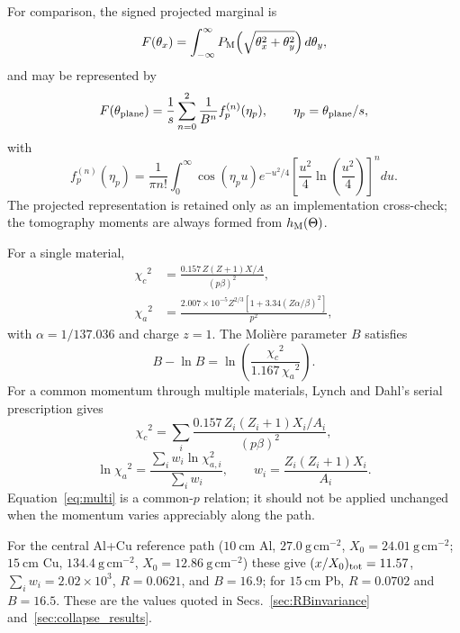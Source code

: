 \documentclass[aps,pra,reprint,longbibliography,floatfix]{revtex4-2}
\newcommand{\XZero}{\ensuremath{X_0}}
\newcommand{\chic}{\ensuremath{\chi_c}}
\newcommand{\chia}{\ensuremath{\chi_a}}
\begin{document}
For comparison, the signed projected marginal is
\begin{equation}
F(\theta_x)=\int_{-\infty}^{\infty}P_{\rm M}\!\left(\sqrt{\theta_x^2+\theta_y^2}\right)d\theta_y,
\end{equation}
and may be represented by
\begin{equation}
F(\theta_{\rm plane})=\frac{1}{s}\sum_{n=0}^{2}\frac{1}{B^n}f_p^{(n)}(\eta_p),
\qquad \eta_p=\theta_{\rm plane}/s,
\end{equation}
with
\begin{equation}
f_p^{(n)}(\eta_p)=\frac{1}{\pi n!}\int_0^\infty
\cos(\eta_pu)e^{-u^2/4}
\left[\frac{u^2}{4}\ln\!\left(\frac{u^2}{4}\right)\right]^n du.
\end{equation}
The projected representation is retained only as an implementation cross-check; the tomography moments are always formed from $h_{\rm M}(\Theta)$.

For a single material,
\begin{align}
\chic^2&=\frac{0.157\,Z(Z+1)X/A}{(p\beta)^2},\label{eq:chic}\\
\chia^2&=\frac{2.007\times10^{-5}Z^{2/3}[1+3.34(Z\alpha/\beta)^2]}{p^2},\label{eq:chia}
\end{align}
with $\alpha=1/137.036$ and charge $z=1$.  The Moli\`ere parameter $B$ satisfies
\begin{equation}\label{eq:Bsolve}
B-\ln B=\ln\!\left(\frac{\chic^2}{1.167\,\chia^2}\right).
\end{equation}
For a common momentum through multiple materials, Lynch and Dahl's serial prescription gives
\begin{equation}\label{eq:multi}
\chic^2=\sum_i\frac{0.157\,Z_i(Z_i+1)X_i/A_i}{(p\beta)^2},
\end{equation}
\begin{equation}
\ln\chia^2=\frac{\sum_i w_i\ln\chi_{a,i}^2}{\sum_iw_i},\qquad
w_i=\frac{Z_i(Z_i+1)X_i}{A_i}.
\end{equation}
Equation~\eqref{eq:multi} is a common-$p$ relation; it should not be applied unchanged when the momentum varies appreciably along the path.

For the central Al+Cu reference path ($10~\mathrm{cm}$ Al, $27.0~\mathrm{g\,cm^{-2}}$, $\XZero=24.01~\mathrm{g\,cm^{-2}}$; $15~\mathrm{cm}$ Cu, $134.4~\mathrm{g\,cm^{-2}}$, $\XZero=12.86~\mathrm{g\,cm^{-2}}$) these give $(x/\XZero)_{\rm tot}=11.57$, $\sum_iw_i=2.02\times10^3$, $R=0.0621$, and $B=16.9$; for $15~\mathrm{cm}$ Pb, $R=0.0702$ and $B=16.5$.  These are the values quoted in Secs.~\ref{sec:RBinvariance} and~\ref{sec:collapse_results}.
\end{document}
